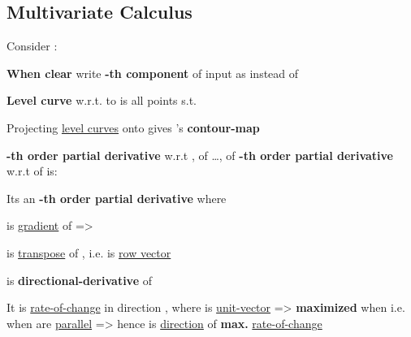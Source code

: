 \subsection*{Multivariate Calculus}


Consider :

\begin{itemize}
      \vItem \textbf{When clear} write \textbf{-th component} of input as
             instead of 

      \vItem \textbf{Level curve} w.r.t. to  is all points
            s.t. 

      \vItem
            Projecting \underline{level curves} onto  gives 's \textbf{contour-map}
\end{itemize}

\hSep %

\textbf{-th order partial derivative} w.r.t
, of \ldots, of \textbf{-th order partial derivative}
w.r.t  of  is:

\begin{itemize}

      \vItem
      \vItem
            Its an \textbf{-th order partial derivative} where 

      \vItem {}
            is \underline{gradient} of \iMbox{f} => 

      \vItem {} is \underline{transpose} of , i.e.  is \underline{row vector}
\end{itemize}

\hSep %

is \textbf{directional-derivative} of \iMbox{f}
\begin{itemize}

      \vItem
            It is \underline{rate-of-change} in direction , where  is \underline{unit-vector}
      \vItem
            => \iMbox{D_{\mathbf{u}}f(\mathbf{x})} \textbf{maximized} when \iMbox{\cos\theta = 1}
      \vItem
            i.e. when  are \underline{parallel} => hence  is
            \underline{direction} of \textbf{max.} \underline{rate-of-change}
\end{itemize}

